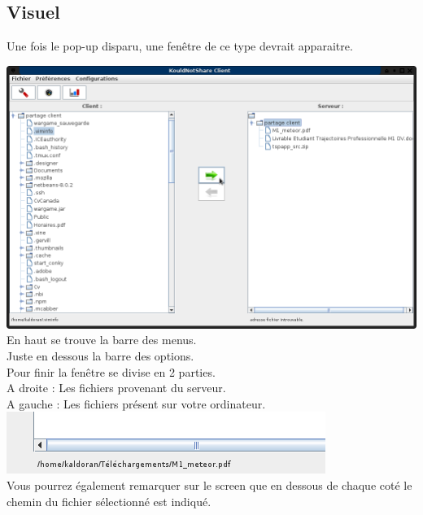 \documentclass[12pt,a4paper]{article}
\begin{document}
\subsection{Visuel}
Une fois le pop-up disparu, une fenêtre de ce type devrait apparaitre.

\begin{center}
	\includegraphics[scale=0.4]{images/envoi.png} \\
	En haut se trouve la barre des menus. \\
	Juste en dessous la barre des options. \\
	
	Pour finir la fenêtre se divise en 2 parties. \\
	A droite : Les fichiers provenant du serveur. \\
	A gauche : Les fichiers présent sur votre ordinateur. \\
	
	\includegraphics[scale=0.4]{images/chemin.png} \\
	Vous pourrez également remarquer sur le screen que en dessous de chaque coté le chemin du fichier sélectionné est indiqué.

\end{center}
\end{document}
